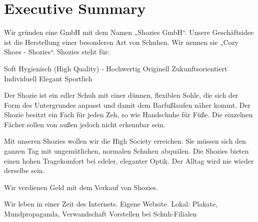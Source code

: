 \chapter{Executive Summary}
\label{cha:1}
Wir gründen eine GmbH mit dem Namen „Shozies GmbH“. Unsere Geschäftsidee ist die Herstellung einer besonderen Art von Schuhen. Wir nennen sie „Cozy Shoes - Shozies“. 
Shozies steht für:

Soft
Hygienisch (High Quality) - Hochwertig
Originell
Zukunftsorientiert
Individuell
Elegant
Sportlich

Der Shozie ist ein edler Schuh mit einer dünnen, flexiblen Sohle, die sich der Form des Untergrundes anpasst und damit dem Barfußlaufen näher kommt. Der Shozie besitzt ein Fach für jeden Zeh, so wie Handschuhe für Füße. Die einzelnen Fächer sollen von außen jedoch nicht erkennbar sein.

Mit unseren Shozies wollen wir die High Society erreichen. Sie müssen sich den ganzen Tag mit ungemütlichen, normalen Schuhen abquälen. Die Shozies bieten einen hohen Tragekomfort bei edeler, eleganter Optik. Der Alltag wird nie wieder derselbe sein.

Wir verdienen Geld mit dem Verkauf von Shozies.

Wir leben in einer Zeit des Internets. Eigene Website. 
Lokal: Plakate, Mundpropaganda, Verwandschaft
Vorstellen bei Schuh-Filialen
